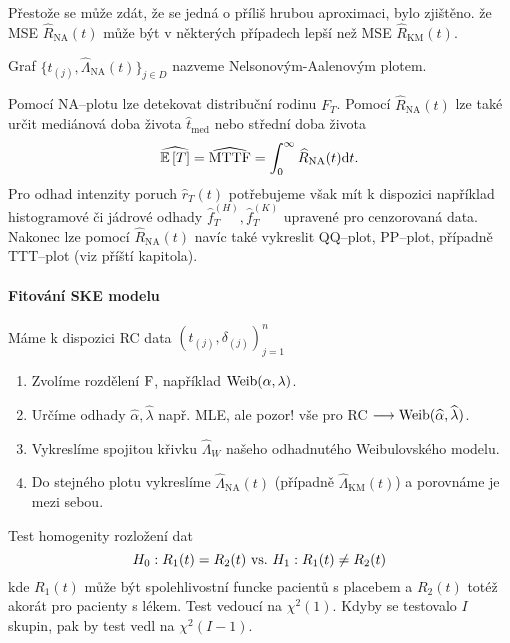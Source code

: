     \begin{remark}
        Přestože se může zdát, že se jedná o příliš hrubou aproximaci, bylo zjištěno. že MSE $\widehat{R}_\mathrm{NA}(t)$ může být v některých případech lepší než MSE $\widehat{R}_\mathrm{KM}(t)$.
    \end{remark}
    
    \begin{define}
        Graf $\lbrace t_{(j)}, \widehat{\Lambda}_\mathrm{NA}(t) \rbrace_{j\in D}$ nazveme Nelsonovým-Aalenovým plotem. 
    \end{define}
        
    \begin{remark}
        Pomocí NA--plotu lze detekovat distribuční rodinu $F_T$. Pomocí $\widehat{R}_\mathrm{NA}(t)$ lze také určit mediánová doba života $\widehat{t}_{\mathrm{med}}$ nebo střední doba života $$\widehat{\mathbb{E}\left[ T \right]} =\widehat{\mathrm{MTTF}} = \int_0^{\infty} \widehat{R}_\mathrm{NA}(t) \mathrm{d} t .$$ Pro odhad intenzity poruch $\widehat{r}_T(t)$ potřebujeme však mít k dispozici například histogramové či jádrové odhady $\widehat{f}_T^{(H)} ,\widehat{f}_T^{(K)}$ upravené pro cenzorovaná data. Nakonec lze pomocí $\widehat{R}_\mathrm{NA}(t)$ navíc také vykreslit QQ--plot, PP--plot, případně TTT--plot (viz příští kapitola).
    \end{remark}
    
    \paragraph{Fitování SKE modelu} Máme k dispozici RC data $(t_{(j)}, \delta_{(j)})_{j=1}^n$
    
    \begin{enumerate}
        \item Zvolíme rozdělení $\mathrm{F}$, například $\mathrm{Weib}(\alpha, \lambda)$.
        \item Určíme odhady $\widehat{\alpha}, \widehat{\lambda}$ např. MLE, ale pozor! vše pro RC $\longrightarrow \mathrm{Weib}(\widehat{\alpha},\widehat{\lambda} )$.
        \item Vykreslíme spojitou křivku $\widehat{\Lambda}_W$ našeho odhadnutého Weibulovského modelu.
        \item Do stejného plotu vykreslíme $\widehat{\Lambda}_\mathrm{NA}(t)$ (případně $\widehat{\Lambda}_\mathrm{KM}(t)$) a porovnáme je mezi sebou.
    \end{enumerate}
    
    \begin{remark}
        Test homogenity rozložení dat 
        $$H_0: R_1(t) = R_2(t) ~\text{vs.}~ H_1: R_1(t) \neq R_2(t)$$
        kde $R_1(t)$ může být spolehlivostní funcke pacientů s placebem a $R_2(t)$ totéž akorát pro pacienty s lékem. Test vedoucí na $\chi^2(1)$. Kdyby se testovalo $I$ skupin, pak by test vedl na $\chi^2(I-1)$.
    \end{remark}
    
